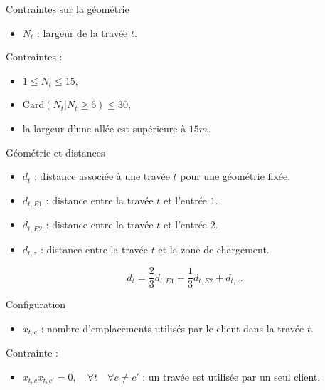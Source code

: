 \begin{frame}{Contraintes sur la géométrie}
\vfill 
\begin{itemize}
    \item $N_t$ : largeur de la travée $t$.
\end{itemize} 
\vfill
Contraintes : 
  \vfill
\begin{itemize}
 \item $1 \leq N_t \leq 15$,
    \vfill
    \item $\mathrm{Card}(N_t\vert N_t \geq  6) \leq  30$,
    \vfill
     \item la largeur d'une allée est supérieure à $15m$.
     \vfill
   
\end{itemize}   
  \vfill

    
\end{frame}




\begin{frame}{Géométrie et distances}
\vfill
\begin{itemize}
    \item $d_t$ : distance associée à une travée $t$ pour une géométrie fixée.
    \vfill
    \item $d_{t,E1}$ : distance entre la travée $t$ et l'entrée $1$.
    \vfill
    \item $d_{t,E2}$ :  distance entre la travée $t$ et l'entrée $2$.
    \vfill
    \item $d_{t,z}$ :  distance entre la travée $t$ et la zone de chargement.
    
\end{itemize}
\vfill
     $$d_t=\frac{2}{3}d_{t,E1}+\frac{1}{3}d_{t,E2}+d_{t,z}.$$


    \vfill
\end{frame}

\begin{frame}{Configuration}

   \begin{itemize}
       \item  $x_{t,c}$ : nombre d'emplacements utilisés par le client dans la travée $t$.
   \end{itemize} 
   
   \vfill Contrainte : 
   
   \vfill
   \begin{itemize}
   
       \item $x_{t,c}x_{t,c'}=0,\quad \forall t \quad \forall c\neq c'$ : un travée est utilisée par un seul client.
       \end{itemize}
   \vfill
  
\end{frame}




